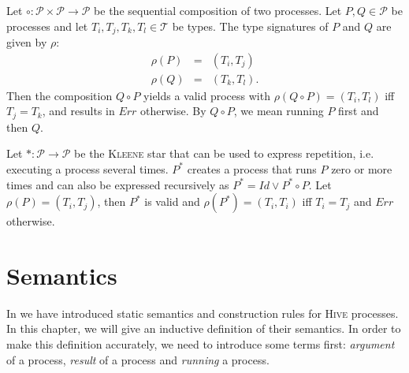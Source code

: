 \begin{definition}
\label{def:static_sequence}
Let $\circ \colon \mathcal{P} \times \mathcal{P} \to \mathcal{P}$ be the sequential composition of two processes. Let $P, Q \in \mathcal{P}$ be processes and let $T_i, T_j, T_k, T_l \in \mathcal{T}$ be types. The type signatures of $P$ and $Q$ are given by $\rho$: 
\begin{eqnarray*}
  \rho \left( P \right) & = & \left( T_i, T_j \right) \\
  \rho \left( Q \right) & = & \left( T_k, T_l \right).
\end{eqnarray*}
Then the composition $Q \circ P$ yields a valid process with $\rho \left( Q \circ P \right) = \left( T_i, T_l \right)$ iff $T_j = T_k$, and results in $Err$ otherwise. By $Q \circ P$, we mean running $P$ first and then $Q$.

\hfill\qedsymbol
\end{definition}


\begin{definition}
Let $* \colon \mathcal{P} \to \mathcal{P}$ be the \textsc{Kleene} star that can be used to express repetition, i.e. executing a process several times. $P^*$ creates a process that runs $P$ zero or more times and can also be expressed recursively as $P^* = Id \vee P^* \circ P$. Let $\rho \left( P \right) = \left( T_i, T_j \right)$, then $P^*$ is valid and $\rho \left( P^* \right) = \left( T_i, T_i \right)$ iff $T_i = T_j$ and $Err$ otherwise.

\hfill\qedsymbol
\end{definition}




\section{Semantics}
\label{chp:semantics}
In  we have introduced static semantics and construction rules for \textsc{Hive} processes. In this chapter, we will give an inductive definition of their semantics. In order to make this definition accurately, we need to introduce some terms first: \textit{argument} of a process, \textit{result} of a process and \textit{running} a process.

